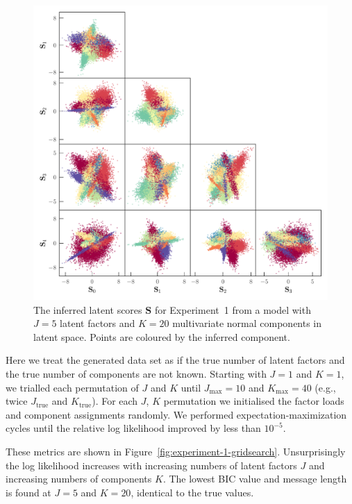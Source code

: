 \documentclass[twocolumn]{aastex62}
\newcommand{\factorscores}{\textbf{S}}
\newcommand{\NumLatentFactors}{J}
\newcommand{\NumComponents}{K}
\begin{document}
\begin{figure}
	\includegraphics[width=\textwidth]{experiments/exp1-latent.pdf}
    \caption{The inferred latent scores $\factorscores$ for Experiment~1
    		 from a model with $\NumLatentFactors = 5$ latent factors and
		 	 $\NumComponents = 20$ multivariate normal components in
			 latent space.
             Points are coloured by the inferred component.}
    \label{fig:exp1-latent}
\end{figure}


Here we treat the generated data set as if the true number of latent factors
and the true number of components are not known. Starting with $\NumLatentFactors = 1$
and $\NumComponents = 1$, we trialled each permutation of $\NumLatentFactors$ and $\NumComponents$
until $\NumLatentFactors_\textrm{max} = 10$
and   $\NumComponents_\textrm{max} = 40$ (e.g., twice $\NumLatentFactors_\textrm{true}$ and $\NumComponents_\textrm{true}$).
For each $\NumLatentFactors$, $\NumComponents$ permutation we initialised the factor
loads and component assignments randomly. We performed expectation-maximization 
cycles until the relative log likelihood improved by less than $10^{-5}$. 



These metrics are shown in Figure~\ref{fig:experiment-1-gridsearch}.
Unsurprisingly the log likelihood increases with increasing numbers of latent
factors $\NumLatentFactors$ and increasing numbers of components $\NumComponents$.
The lowest BIC value and message length is found at $\NumLatentFactors = 5$
and $\NumComponents = 20$, identical to the true values.
\end{document}
